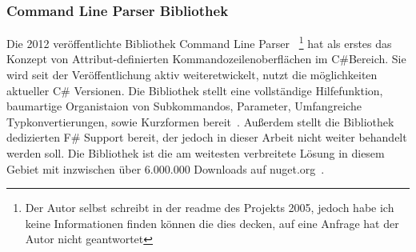  \subsubsection{Command Line Parser Bibliothek}
 Die 2012 veröffentlichte Bibliothek Command Line Parser~\cite{FirstCommandLineParserCommit}
 \footnote{Der Autor selbst schreibt in der readme des Projekts 2005, jedoch habe ich keine Informationen finden können die dies decken, auf eine Anfrage hat der Autor nicht geantwortet}
 hat als erstes das Konzept von Attribut-definierten Kommandozeilenoberflächen im C\#Bereich.
 Sie wird seit der Veröffentlichung aktiv weiteretwickelt, nutzt die möglichkeiten aktueller C\# Versionen.
 Die Bibliothek stellt eine vollständige Hilfefunktion, baumartige Organistaion von Subkommandos, Parameter, Umfangreiche Typkonvertierungen, sowie Kurzformen bereit~\cite{CommandLineParserWiki}.
 Au\ss erdem stellt die Bibliothek dedizierten F\# Support bereit, der jedoch in dieser Arbeit nicht weiter behandelt werden soll.
 Die Bibliothek ist die am weitesten verbreitete Lösung in diesem Gebiet mit inzwischen über 6.000.000 Downloads auf nuget.org~\cite{CommandLineParserNuget}.